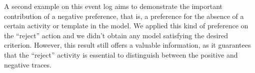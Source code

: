 A second example on this event log aims to demonstrate the important contribution of a negative preference, that is, a preference for the absence of a certain activity or template in the model. We applied this kind of preference on the “reject” action and we didn’t obtain any model satisfying the desired criterion. However, this result still offers a valuable information, as it guarantees that the “reject” activity is essential to distinguish between the positive and negative traces.

